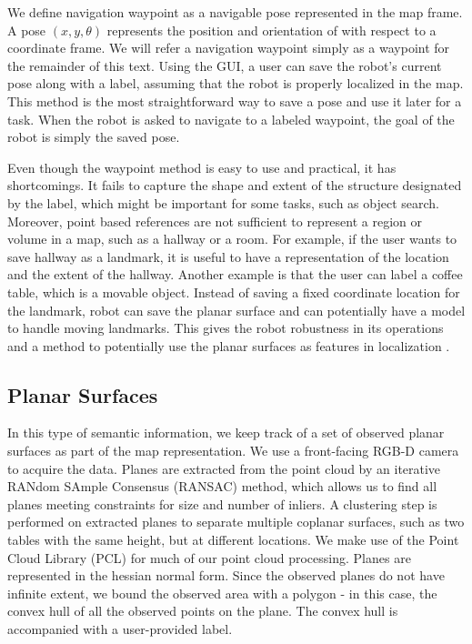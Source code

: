 We define navigation waypoint as a navigable pose represented in the map frame. A pose $(x,y,\theta)$ represents the position and orientation of with respect to a coordinate frame. We will refer a navigation waypoint simply as a waypoint for the remainder of this text. Using the GUI, a user can save the robot's current pose along with a label, assuming that the robot is properly localized in the map. This method is the most straightforward way to save a pose and use it later for a task. When the robot is asked to navigate to a labeled waypoint, the goal of the robot is simply the saved pose.

Even though the waypoint method is easy to use and practical, it has shortcomings. It fails to capture the shape and extent of the structure designated by the label, which might be important for some tasks, such as object search. Moreover, point based references are not sufficient to represent a region or volume in a map, such as a hallway or a room. For example, if the user wants to save hallway as a landmark, it is useful to have a representation of the location and the extent of the hallway. Another example is that the user can label a coffee table, which is a movable object. Instead of saving a fixed coordinate location for the landmark, robot can save the planar surface and can potentially have a model to handle moving landmarks. This gives the robot robustness in its operations and a method to potentially use the planar surfaces as features in localization \cite{trevor2012planar}.

\subsection{Planar Surfaces}
\label{sec:map_landmarks}

In this type of semantic information, we keep track of a set of observed planar surfaces as part of the map representation. We use a front-facing RGB-D camera to acquire the data. Planes are extracted from the point cloud by an iterative RANdom SAmple Consensus (RANSAC) method, which allows us to find all planes meeting constraints for size and number of inliers. A clustering step is performed on extracted planes to separate multiple coplanar surfaces, such as two tables with the same height, but at different locations. We make use of the Point Cloud Library (PCL) \cite{rusu20113d} for much of our point cloud processing. Planes are represented in the hessian normal form. Since the observed planes do not have infinite extent, we bound the observed area with a polygon - in this case, the convex hull of all the observed points on the plane. The convex hull is accompanied with a user-provided label. 

